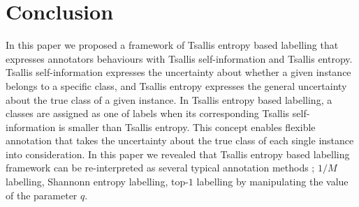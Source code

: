 \documentclass[a4paper,conference]{IEEEtran}
\begin{document}
\section{Conclusion}\label{sec:conclusion}
In this paper we proposed a framework of Tsallis entropy based labelling that expresses annotators behaviours with Tsallis self-information and Tsallis entropy. 
Tsallis self-information expresses the uncertainty about whether a given instance belongs to a specific class, and Tsallis entropy expresses the general uncertainty about the true class of a given instance.
In Tsallis entropy based labelling, a classes are assigned as one of labels when its corresponding Tsallis self-information is smaller than Tsallis entropy. 
This concept enables flexible annotation that takes the uncertainty about the true class of each single instance into consideration.
In this paper we revealed that Tsallis entropy based labelling framework can be re-interpreted as several typical annotation methods ; $1/M$ labelling, Shannonn entropy labelling, top-$1$ labelling by manipulating the value of the parameter $q$. 
\end{document}
